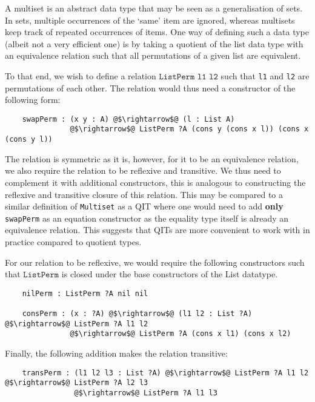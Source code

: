 \documentclass[12pt,twoside,maitrise]{dms}
\theoremstyle{definition}
\numberwithin{equation}{section}
\numberwithin{table}{chapter}
\numberwithin{figure}{chapter}
\newcommand\id[1] {\texttt{#1}}
\newcommand\fn[1] {\texttt{#1}}
\begin{document}
A multiset is an abstract data type that may be seen as a generalisation of
sets. In sets, multiple occurrences of the `same' item are ignored, whereas
multisets keep track of repeated occurrences of items. One way of defining such
a data type (albeit not a very efficient one) is by taking a quotient of the
list data type with an equivalence relation such that all permutations of a
given list are equivalent.

To that end, we wish to define a relation $\fn{ListPerm l1 l2}$ such that
\id{l1} and \id{l2} are permutations of each other. The relation would thus need
a constructor of the following form:

\begin{verbatim}
    swapPerm : (x y : A) @$\rightarrow$@ (l : List A)
               @$\rightarrow$@ ListPerm ?A (cons y (cons x l)) (cons x (cons y l))
\end{verbatim}

The relation is symmetric as it is, however, for it to be an equivalence
relation, we also require the relation to be reflexive and transitive. We thus
need to complement it with additional constructors, this is analogous to
constructing the reflexive and transitive closure of this relation. This may be
compared to a similar definition of \id{Multiset} as a QIT where one would need
to add \textbf{only} \id{swapPerm} as an equation constructor as the equality
type itself is already an equivalence relation. This suggests that QITs are more
convenient to work with in practice compared to quotient types.

For our relation to be reflexive, we would require the following constructors
such that $\fn{ListPerm}$ is closed under the base constructors of the List
datatype.

\begin{verbatim}
    nilPerm : ListPerm ?A nil nil

    consPerm : (x : ?A) @$\rightarrow$@ (l1 l2 : List ?A) @$\rightarrow$@ ListPerm ?A l1 l2
               @$\rightarrow$@ ListPerm ?A (cons x l1) (cons x l2)
\end{verbatim}

Finally, the following addition makes the relation transitive:

\begin{verbatim}
    transPerm : (l1 l2 l3 : List ?A) @$\rightarrow$@ ListPerm ?A l1 l2 @$\rightarrow$@ ListPerm ?A l2 l3
                @$\rightarrow$@ ListPerm ?A l1 l3
\end{verbatim}
\end{document}
